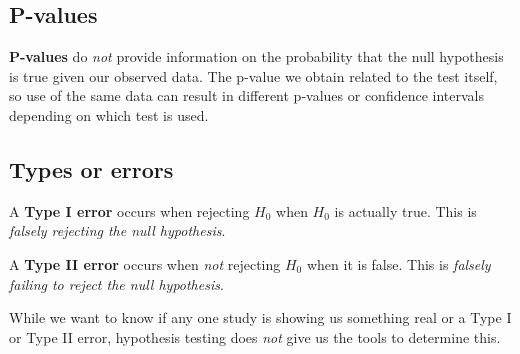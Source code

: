 \documentclass[titlepage, 12pt, leqno]{article}
\begin{document}
\subsection{P-values}
\textbf{P-values} do \textit{not} provide information on the probability that the null hypothesis is true given our observed data. The p-value we obtain related to the test itself, so use of the same data can result in different p-values or confidence intervals depending on which test is used.

\pagebreak
\subsection{Types or errors}
A \textbf{Type I error} occurs when rejecting $H_0$ when $H_0$ is actually true. This is \textit{falsely rejecting the null hypothesis}.

A \textbf{Type II error} occurs when \textit{not} rejecting $H_0$ when it is false. This is \textit{falsely failing to reject the null hypothesis}.

While we want to know if any one study is showing us something real or a Type I or Type II error, hypothesis testing does \textit{not} give us the tools to determine this.
\end{document}
